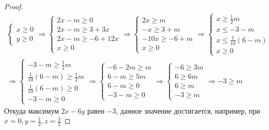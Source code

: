 \begin{proof}
\begin{gather*}
\begin{cases}
            x \geqslant 0\\
            y \geqslant 0
        \end{cases}
        \Rightarrow
        \begin{cases}
            2x - m \geqslant 0\\
            2x - m \geqslant 3 + 3x\\
            2x - m \geqslant -6 + 12x\\
            x \geqslant 0
        \end{cases}
        \Rightarrow
        \begin{cases}
            2x \geqslant m\\
            -x \geqslant 3 + m\\
            -10x \geqslant -6 + m\\
            x \geqslant 0
        \end{cases}
        \Rightarrow
        \begin{cases}
            x \geqslant \frac{1}{2}m\\
            x \leqslant -3 - m\\
            x \leqslant \frac{1}{10} (6 - m)\\
            x \geqslant 0
        \end{cases}\\
        \Rightarrow
        \begin{cases}
            -3 - m \geqslant \frac{1}{2}m\\
            \frac{1}{10} (6 - m) \geqslant \frac{1}{2}m\\
            \frac{1}{10} (6 - m) \geqslant 0\\
            -3 - m \geqslant 0
        \end{cases}
        \Rightarrow
        \begin{cases}
            -6 - 2m \geqslant m\\
            6 - m \geqslant 5m\\
            6 - m \geqslant 0\\
            -3 - m \geqslant 0
        \end{cases}
        \Rightarrow
        \begin{cases}
            -6 \geqslant 3m\\
            6 \geqslant 6m\\
            6 \geqslant m\\
            -3 \geqslant m
        \end{cases}
        \Rightarrow
        -3 \geqslant m
    \end{gather*}
    Откуда максимум $2x-6y$ равен $-3$, данное значение достигается, например, при $x = 0, y = \frac{1}{2}, z = \frac{3}{2}$
\end{proof}
\vskip 0.6in



